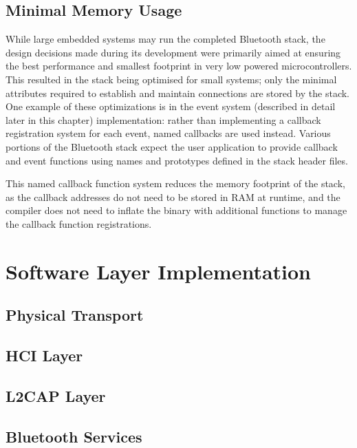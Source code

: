 \FloatBarrier
\subsection{Minimal Memory Usage}

While large embedded systems may run the completed Bluetooth stack, the design decisions made during its development were primarily aimed at ensuring the best performance and smallest footprint in very low powered microcontrollers. This resulted in the stack being optimised for small systems; only the minimal attributes required to establish and maintain connections are stored by the stack. One example of these optimizations is in the event system (described in detail later in this chapter) implementation: rather than implementing a callback registration system for each event, named callbacks are used instead. Various portions of the Bluetooth stack expect the user application to provide callback and event functions using names and prototypes defined in the stack header files.

This named callback function system reduces the memory footprint of the stack, as the callback addresses do not need to be stored in RAM at runtime, and the compiler does not need to inflate the binary with additional functions to manage the callback function registrations.

\section{Software Layer Implementation}


\FloatBarrier
\subsection{Physical Transport}


\FloatBarrier
\subsection{HCI Layer}


\FloatBarrier
\subsection{L2CAP Layer}


\FloatBarrier
\subsection{Bluetooth Services}

